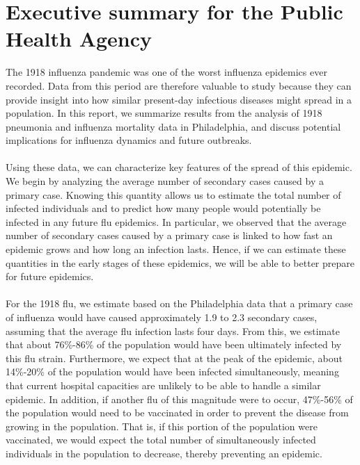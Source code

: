 \documentclass[12pt]{article}\usepackage[]{graphicx}\usepackage[]{color}
\begin{document}
\section{Executive summary for the Public Health Agency}

\ExecSumm
\newpage
The 1918 influenza pandemic was one of the worst influenza epidemics ever recorded. Data from this period are therefore valuable to study because they can provide insight into how similar present-day infectious diseases might spread in a population. In this report, we summarize results from the analysis of 1918 pneumonia and influenza mortality data in Philadelphia, and discuss potential implications for influenza dynamics and future outbreaks. \\\\

Using these data, we can characterize key features of the spread of this epidemic. We begin by analyzing the average number of secondary cases caused by a primary case. Knowing this quantity allows us to estimate the total number of infected individuals and to predict how many people would potentially be infected in any future flu epidemics. In particular, we observed that the average number of secondary cases caused by a primary case is linked to how fast an epidemic grows and how long an infection lasts. Hence, if we can estimate these quantities in the early stages of these epidemics, we will be able to better prepare for future epidemics. \\\\

For the 1918 flu, we estimate based on the Philadelphia data that a primary case of influenza would have caused approximately 1.9 to 2.3 secondary cases, assuming that the average flu infection lasts four days. From this, we estimate that about 76\%-86\% of the population would have been ultimately infected by this flu strain. Furthermore, we expect that at the peak of the epidemic, about 14\%-20\% of the population would have been infected simultaneously, meaning that current hospital capacities are unlikely to be able to handle a similar epidemic. In addition, if another flu of this magnitude were to occur, 47\%-56\% of the population would need to be vaccinated in order to prevent the disease from growing in the population. That is, if this portion of the population were vaccinated, we would expect the total number of simultaneously infected individuals in the population to decrease, thereby preventing an epidemic. \\\\
\end{document}

